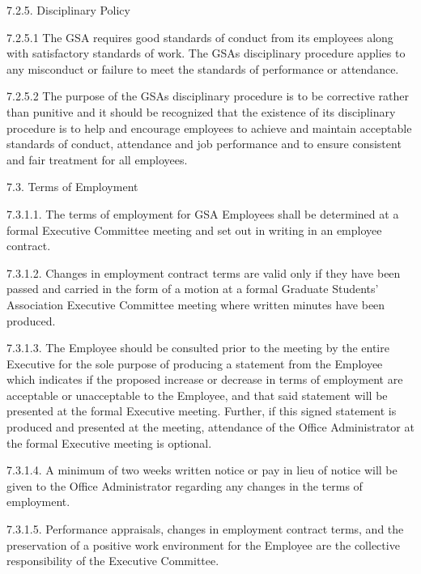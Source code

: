  
 
 7.2.5. Disciplinary Policy 
 
 7.2.5.1 The GSA requires good standards of conduct from its employees 
 along with satisfactory standards of work. The GSAs disciplinary 
 procedure applies to any misconduct or failure to meet the standards 
 of performance or attendance. 
 
 
 
 7.2.5.2 The purpose of the GSAs disciplinary procedure is to be corrective 
 rather than punitive and it should be recognized that the existence 
 of its disciplinary procedure is to help and encourage employees to 
 achieve and maintain acceptable standards of conduct, attendance 
 and job performance and to ensure consistent and fair treatment for 
 all employees. 
 
 7.3. Terms of Employment 
 
 7.3.1.1. The terms of employment for GSA Employees shall be determined 
 at a formal Executive Committee meeting and set out in writing in an 
 employee contract. 
 
 
 
 7.3.1.2. Changes in employment contract terms are valid only if they have 
 been passed and carried in the form of a motion at a formal Graduate 
 Students' Association Executive Committee meeting where written minutes 
 have been produced. 
 
 
 
 7.3.1.3. The Employee should be consulted prior to the meeting by the 
 entire Executive for the sole purpose of producing a statement from the 
 Employee which indicates if the proposed increase or decrease in terms of 
 employment are acceptable or unacceptable to the Employee, and that said 
 statement will be presented at the formal Executive meeting. Further, if 
 this signed statement is produced and presented at the meeting, attendance 
 of the Office Administrator at the formal Executive meeting is optional. 
 
 
 
 7.3.1.4. A minimum of two weeks written notice or pay in lieu of notice will 
 be given to the Office Administrator regarding any changes in the terms of 
 employment. 
 
 
 
 7.3.1.5. Performance appraisals, changes in employment contract 
 terms, and the preservation of a positive work environment for the 
 Employee are the collective responsibility of the Executive Committee. 

